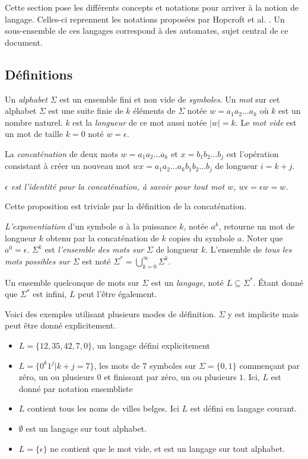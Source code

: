 Cette section pose les différents concepts et notations pour arriver à la notion de langage. Celles-ci reprennent les notations proposées par Hopcroft et al. \cite{Hopcroft00}. Un sous-ensemble de ces langages correspond à des automates, sujet central de ce document.

\subsection{Définitions}

Un \emph{alphabet} $\Sigma$ est un ensemble fini et non vide de \emph{symboles}. Un \emph{mot} sur cet alphabet $\Sigma$ est une suite finie de $k$ éléments de $\Sigma$ notée $ w = a_1a_2\dots a_k$ où $k$ est un nombre naturel. $k$ est la \emph{longueur} de ce mot aussi notée $|w|=k$. Le \emph{mot vide} est un mot de taille $k=0$ noté $w=\epsilon$.

La \emph{concaténation} de deux mots $w=a_1a_2\dots a_k$ et $x=b_1b_2\dots b_j$ est l'opération consistant à créer un nouveau mot $wx=a_1a_2\dots a_kb_1b_2\dots b_j$ de longueur $i=k+j$.

\begin{proposition}\emph{
$\epsilon$ est \emph{l'identité pour la concaténation}, à savoir pour tout mot $w$, $w\epsilon = \epsilon w = w$.}
\end{proposition}

Cette proposition est triviale par la définition de la concaténation.

\emph{L'exponentiation} d'un symbole $a$ à la puissance $k$, notée $a^k$, retourne un mot de longueur $k$ obtenu par la concaténation de $k$ copies du symbole $a$. Noter que $a^0=\epsilon$. $\Sigma^k$ est \emph{l'ensemble des mots sur $\Sigma$} de longueur $k$. L'ensemble de \emph{tous les mots possibles sur $\Sigma$} est noté $\Sigma^* = \bigcup_{k=0}^{\infty}\Sigma^k$.


Un ensemble quelconque de mots sur $\Sigma$ est un \emph{langage}, noté $L \subseteq \Sigma^*$. Étant donné que $\Sigma^*$ est infini, $L$ peut l'être également.

\begin{example}[Langages] Voici des exemples utilisant plusieurs modes de définition. $\Sigma$ y est implicite mais peut être donné explicitement.
	\begin{itemize}
		\item $L=\{12,35,42,7,0\}$, un langage défini explicitement
		\item $L=\{0^k1^j|k+j=7\}$, les mots de 7 symboles sur $\Sigma=\{0,1\}$ commençant par zéro, un ou plusieurs $0$ et finissant par zéro, un ou plusieurs $1$. Ici, $L$ est donné par notation ensembliste
		\item $L$ contient tous les noms de villes belges. Ici $L$ est défini en langage courant.
		\item $\emptyset$ est un langage sur tout alphabet.
		\item $L=\{\epsilon\}$ ne contient que le mot vide, et est un langage sur tout alphabet.
	\end{itemize}
\end{example}


